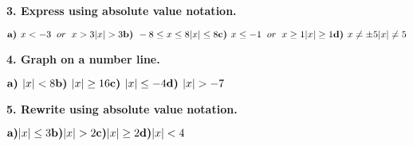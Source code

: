 \documentclass[14pt, a4paper]{extarticle}
\begin{document}
\textbf{3. Express using absolute value notation.} \\
\begin{adjustwidth}{1cm}{0pt}
    \begin{math}
        \textbf{a) } x < -3 \hspace{2mm} or \hspace{2mm} x > 3 \\
        |x| > 3 \\
        \\
        \textbf{b) } -8 \leq x \leq 8 \\
        |x| \leq 8 \\
        \\
        \textbf{c) } x \leq -1 \hspace{2mm} or \hspace{2mm} x \geq 1 \\
        |x| \geq 1 \\
        \\
        \textbf{d) } x \neq \pm 5 \\
        |x| \neq 5 \\
    \end{math}
\end{adjustwidth}

\textbf{4. Graph on a number line.} \\
\begin{adjustwidth}{1cm}{0pt}
    \begin{math}
        \textbf{a) } |x| < 8 \\
        \\
        \textbf{b) } |x| \geq 16 \\
        \\
        \textbf{c) } |x| \leq -4 \\
        \\
        \textbf{d) } |x| > -7 \\
    \end{math}
\end{adjustwidth}

\textbf{5. Rewrite using absolute value notation.} \\
\begin{adjustwidth}{1cm}{0pt}
    \begin{math}
        \textbf{a)} \\
        |x| \leq 3 \\
        \\
        \textbf{b)} \\
        |x| > 2 \\
        \\
        \textbf{c)} \\
        |x| \geq 2 \\
        \\
        \textbf{d)} \\
        |x| < 4 \\
    \end{math}
\end{adjustwidth}
\end{document}
